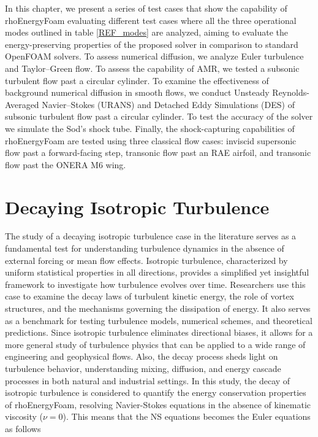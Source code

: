 \documentclass[a5paper]{sapthesis}
\begin{document}
	In this chapter, we present a series of test cases that show the capability of rhoEnergyFoam evaluating different test cases where all the three operational modes outlined in table \ref{REF_modes} are analyzed, aiming to evaluate the energy-preserving properties of the proposed solver in comparison to standard OpenFOAM solvers. To assess numerical diffusion, we analyze Euler turbulence and Taylor–Green flow. To assess the capability of AMR, we tested a subsonic turbulent flow past a circular cylinder. To examine the effectiveness of background numerical diffusion in smooth flows, we conduct Unsteady Reynolds-Averaged Navier–Stokes (URANS) and Detached Eddy Simulations (DES) of subsonic turbulent flow past a circular cylinder. To test the accuracy of the solver we simulate the Sod's shock tube. Finally, the shock-capturing capabilities of rhoEnergyFoam are tested using three classical flow cases: inviscid supersonic flow past a forward-facing step, transonic flow past an RAE airfoil, and transonic flow past the ONERA M6 wing.
	
	\section{Decaying Isotropic Turbulence}
	The study of a decaying isotropic turbulence case in the literature serves as a fundamental test for understanding turbulence dynamics in the absence of external forcing or mean flow effects. Isotropic turbulence, characterized by uniform statistical properties in all directions, provides a simplified yet insightful framework to investigate how turbulence evolves over time. Researchers use this case to examine the decay laws of turbulent kinetic energy, the role of vortex structures, and the mechanisms governing the dissipation of energy. It also serves as a benchmark for testing turbulence models, numerical schemes, and theoretical predictions. Since isotropic turbulence eliminates directional biases, it allows for a more general study of turbulence physics that can be applied to a wide range of engineering and geophysical flows. Also, the decay process sheds light on turbulence behavior, understanding mixing, diffusion, and energy cascade processes in both natural and industrial settings.
	In this study, the decay of isotropic turbulence is considered to quantify the energy conservation properties of rhoEnergyFoam, resolving Navier-Stokes equations in the absence of kinematic viscosity ($\nu = 0$). This means that the NS equations becomes the Euler equations as follows
	
\end{document}
